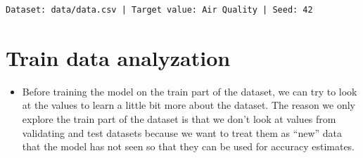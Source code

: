 \documentclass[
  letterpaper,
  DIV=11,
  numbers=noendperiod]{scrartcl}
\providecommand{\tightlist}{%
  \setlength{\itemsep}{0pt}\setlength{\parskip}{0pt}}\usepackage{longtable,booktabs,array}
\begin{document}
\begin{verbatim}
Dataset: data/data.csv | Target value: Air Quality | Seed: 42
\end{verbatim}

\section{Train data analyzation}\label{train-data-analyzation}

\begin{itemize}
\tightlist
\item
  Before training the model on the train part of the dataset, we can try
  to look at the values to learn a little bit more about the dataset.
  The reason we only explore the train part of the dataset is that we
  don't look at values from validating and test datasets because we want
  to treat them as ``new'' data that the model has not seen so that they
  can be used for accuracy estimates.
\end{itemize}
\end{document}
